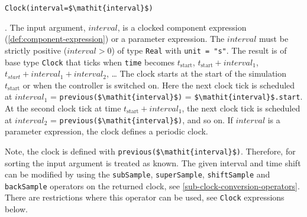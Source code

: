 \begin{operatordefinition*}[Clock]\label{modelica:clock-interval}
\begin{synopsis}\begin{lstlisting}
Clock(interval=$\mathit{interval}$)
\end{lstlisting}\end{synopsis}
\begin{semantics}
.
The input argument, $\mathit{interval}$, is a clocked component expression (\cref{def:component-expression}) or a parameter expression.
The $\mathit{interval}$ must be strictly positive ($\mathit{interval} > 0$) of type \lstinline!Real! with \lstinline!unit = "s"!.
The result is of base type \lstinline!Clock! that ticks when \lstinline!time! becomes $t_{\mathrm{start}}$, $t_{\mathrm{start}} + \mathit{interval}_{1}$, $t_{\mathit{start}} + \mathit{interval}_{1} + \mathit{interval}_{2}$, \@\ldots{}
The clock starts at the start of the simulation $t_{\mathrm{start}}$ or when the controller is switched on.
Here the next clock tick is scheduled at $\mathit{interval}_{1}$ = \lstinline!previous($\mathit{interval}$)! = \lstinline!$\mathit{interval}$.start!.
At the second clock tick at time $t_{\mathrm{start}} + \mathit{interval}_{1}$, the next clock tick is scheduled at $\mathit{interval}_{2}$ = \lstinline!previous($\mathit{interval}$)!, and so on.
If $\mathit{interval}$ is a parameter expression, the clock defines a periodic clock.

\begin{nonnormative}
Note, the clock is defined with \lstinline!previous($\mathit{interval}$)!.
Therefore, for sorting the input argument is treated as known.
The given interval and time shift can be modified by using the \lstinline!subSample!, \lstinline!superSample!, \lstinline!shiftSample! and \lstinline!backSample! operators on the returned clock, see \cref{sub-clock-conversion-operators}.
There are restrictions where this operator can be used, see \lstinline!Clock! expressions below.
\end{nonnormative}
\end{semantics}
\end{operatordefinition*}

